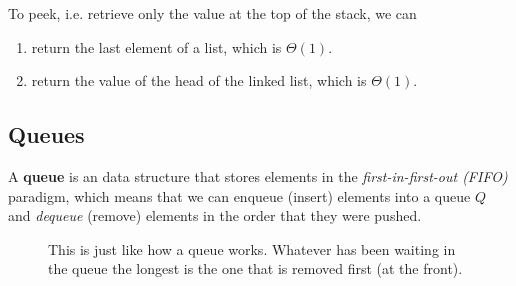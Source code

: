   \begin{algo}
    To peek, i.e. retrieve only the value at the top of the stack, we can 
    \begin{enumerate}
      \item return the last element of a list, which is $\Theta(1)$. 
      \item return the value of the head of the linked list, which is $\Theta(1)$. 
    \end{enumerate}
  \end{algo}

\subsection{Queues}

  \begin{definition}[Queue]
    A \textbf{queue} is an data structure that stores elements in the \textit{first-in-first-out (FIFO)} paradigm, which means that we can enqueue (insert) elements into a queue $Q$ and \textit{dequeue} (remove) elements in the order that they were pushed. 

    \begin{figure}[H]
      \centering 
      \caption{This is just like how a queue works. Whatever has been waiting in the queue the longest is the one that is removed first (at the front).} 
      \label{fig:queue}
    \end{figure}
  \end{definition} 

